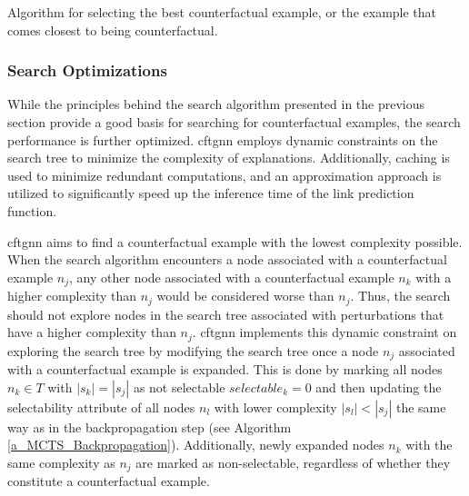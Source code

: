 {
\setlength{\algomargin}{1.25em}
\small
\begin{algorithm}[ht]
\caption{Algorithm for selecting the best counterfactual example, or the example that comes closest to being counterfactual.}
\label{a_MCTS_ResultSelection}
\end{algorithm}
}


\subsubsection{Search Optimizations}
\label{s_Methodology_CoDy_Optimizations}
 While the principles behind the search algorithm presented in the previous section provide a good basis for searching for counterfactual examples, the search performance is further optimized. \gls{cftgnn} employs dynamic constraints on the search tree to minimize the complexity of explanations. Additionally, caching is used to minimize redundant computations, and an approximation approach is utilized to significantly speed up the inference time of the link prediction function.

 \gls{cftgnn} aims to find a counterfactual example with the lowest complexity possible. When the search algorithm encounters a node associated with a counterfactual example $n_j$, any other node associated with a counterfactual example $n_k$ with a higher complexity than $n_j$ would be considered worse than $n_j$. Thus, the search should not explore nodes in the search tree associated with perturbations that have a higher complexity than $n_j$. \gls{cftgnn} implements this dynamic constraint on exploring the search tree by modifying the search tree once a node $n_j$ associated with a counterfactual example is expanded. This is done by marking all nodes $n_k \in T$ with $|s_k| = |s_j|$ as not selectable $selectable_k = 0$ and then updating the selectability attribute of all nodes $n_l$ with lower complexity $|s_l| < |s_j|$ the same way as in the backpropagation step (see Algorithm \ref{a_MCTS_Backpropagation}). Additionally, newly expanded nodes $n_k$ with the same complexity as $n_j$ are marked as non-selectable, regardless of whether they constitute a counterfactual example.

